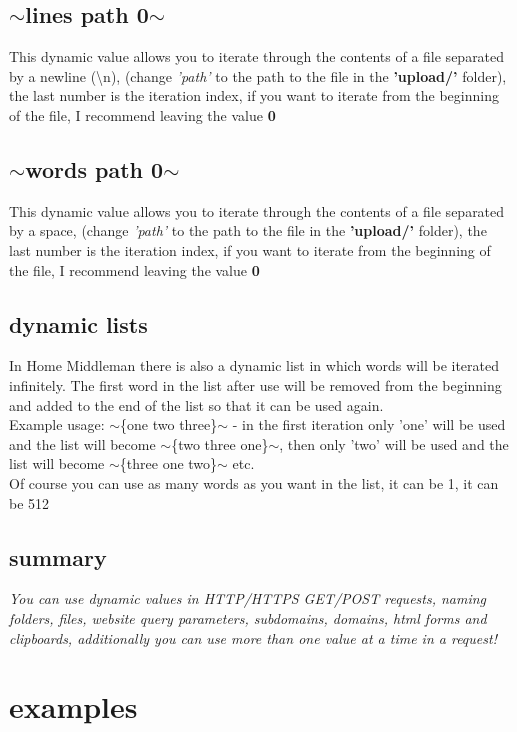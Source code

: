\documentclass{article}
\begin{document}
\subsection{$\sim$lines path 0$\sim$}
This dynamic value allows you to iterate through the contents of a file separated by a newline (\textbackslash n), (change \textit{'path'} to the path to the file in the \textbf{'upload/'} folder), the last number is the iteration index, if you want to iterate from the beginning of the file, I recommend leaving the value \textbf{0}
\subsection{$\sim$words path 0$\sim$}
This dynamic value allows you to iterate through the contents of a file separated by a space, (change \textit{'path'} to the path to the file in the \textbf{'upload/'} folder), the last number is the iteration index, if you want to iterate from the beginning of the file, I recommend leaving the value \textbf{0}
\subsection{dynamic lists}
In Home Middleman there is also a dynamic list in which words will be iterated infinitely. The first word in the list after use will be removed from the beginning and added to the end of the list so that it can be used again.\\
Example usage: $\sim$\{one two three\}$\sim$ - in the first iteration only 'one' will be used and the list will become $\sim$\{two three one\}$\sim$, then only 'two' will be used and the list will become $\sim$\{three one two\}$\sim$ etc.\\
Of course you can use as many words as you want in the list, it can be 1, it can be 512
\subsection{summary}
\textit{You can use dynamic values in HTTP/HTTPS GET/POST requests, naming folders, files, website query parameters, subdomains, domains, html forms and clipboards, additionally you can use more than one value at a time in a request!}
\section{examples}
\end{document}
